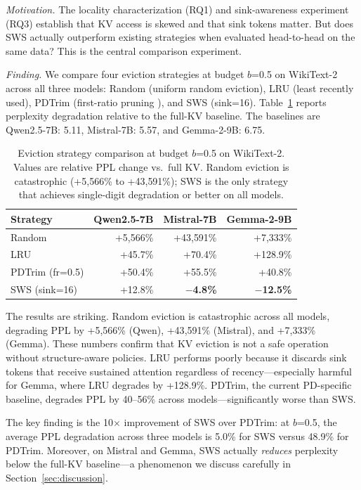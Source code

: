 \documentclass[11pt]{article}
\newcommand{\method}{SWS}
\newcommand{\sws}{SWS}
\newcommand{\pct}{\%}
\theoremstyle{definition}
\theoremstyle{plain}
\begin{document}
\emph{Motivation.}  The locality characterization (RQ1) and sink-awareness experiment (RQ3) establish that KV access is skewed and that sink tokens matter.  But does \method{} actually outperform existing strategies when evaluated head-to-head on the same data?  This is the central comparison experiment.

\emph{Finding.}  We compare four eviction strategies at budget $b$=0.5 on WikiText-2 across all three models: Random (uniform random eviction), LRU (least recently used), PDTrim (first-ratio pruning \citep{pdtrim}), and \sws{} (sink=16).  Table~\ref{tab:eviction-compare} reports perplexity degradation relative to the full-KV baseline.  The baselines are Qwen2.5-7B: 5.11, Mistral-7B: 5.57, and Gemma-2-9B: 6.75.

\begin{table}[t]
\centering
\caption{Eviction strategy comparison at budget $b$=0.5 on WikiText-2.  Values are relative PPL change vs.\ full KV.  Random eviction is catastrophic (+5{,}566\pct{} to +43{,}591\pct{}); \sws{} is the only strategy that achieves single-digit degradation or better on all models.}
\label{tab:eviction-compare}
\small
\begin{tabular}{lrrr}
\toprule
Strategy & Qwen2.5-7B & Mistral-7B & Gemma-2-9B \\
\midrule
Random & +5{,}566\pct{} & +43{,}591\pct{} & +7{,}333\pct{} \\
LRU & +45.7\pct{} & +70.4\pct{} & +128.9\pct{} \\
PDTrim (fr=0.5) & +50.4\pct{} & +55.5\pct{} & +40.8\pct{} \\
\sws{} (sink=16) & +12.8\pct{} & \textbf{$-$4.8\pct{}} & \textbf{$-$12.5\pct{}} \\
\bottomrule
\end{tabular}
\end{table}

The results are striking.  Random eviction is catastrophic across all models, degrading PPL by +5{,}566\pct{} (Qwen), +43{,}591\pct{} (Mistral), and +7{,}333\pct{} (Gemma).  These numbers confirm that KV eviction is not a safe operation without structure-aware policies.  LRU performs poorly because it discards sink tokens that receive sustained attention regardless of recency---especially harmful for Gemma, where LRU degrades by +128.9\pct{}.  PDTrim, the current PD-specific baseline, degrades PPL by 40--56\pct{} across models---significantly worse than \sws{}.

The key finding is the 10$\times$ improvement of \sws{} over PDTrim: at $b$=0.5, the average PPL degradation across three models is 5.0\pct{} for \sws{} versus 48.9\pct{} for PDTrim.  Moreover, on Mistral and Gemma, \sws{} actually \emph{reduces} perplexity below the full-KV baseline---a phenomenon we discuss carefully in Section~\ref{sec:discussion}.
\end{document}
